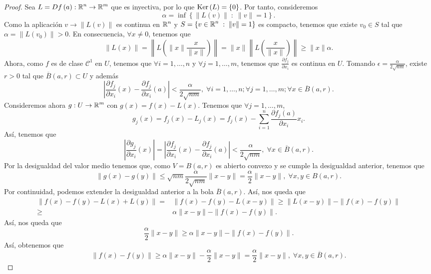 \begin{proof}
	Sea $\displaystyle L = Df\left(a\right) : \mathbb{R}^{n} \to \mathbb{R}^{m} $ que es inyectiva, por lo que $\displaystyle \operatorname{Ker}\left(L\right) = \left\{ 0\right\}  $. Por tanto, consideremos 
	\[\alpha = \inf \left\{ \|L\left(v\right)\| \; : \; \|v\| = 1\right\}  .\]
	Como la aplicación $\displaystyle v \to \|L\left(v\right)\| $ es continua en $\displaystyle \mathbb{R}^{n} $ y $\displaystyle S = \left\{ v \in \mathbb{R}^{n} \; : \; \|v\|=1\right\}  $ es compacto, tenemos que existe $\displaystyle v_{0} \in S $ tal que $\displaystyle \alpha = \|L\left(v_{0}\right)\| > 0 $. En consecuencia, $\displaystyle \forall x \neq 0 $, tenemos que
	\[ \|L\left(x\right)\| = \left\|L\left(\|x\|\frac{x}{\|x\|}\right)\right\| = \|x\|\left\|L\left(\frac{x}{\|x\|}\right)\right\|\geq \|x\|\alpha  .\]
Ahora, como $\displaystyle f $ es de clase $\displaystyle \mathcal{C}^{1} $ en $\displaystyle U $, tenemos que $\displaystyle \forall i = 1, \ldots, n $ y $\displaystyle \forall j = 1, \ldots, m $, tenemos que $\displaystyle \frac{\partial f_{j}}{\partial x_{i}} $ es continua en $\displaystyle U $. Tomando $\displaystyle \epsilon = \frac{\alpha }{2\sqrt{nm}} $, existe $\displaystyle r > 0 $ tal que $\displaystyle \overline{B}\left(a,r\right) \subset U $ y además
\[ \left|\frac{\partial f_{j}}{\partial x_{i}}\left(x\right)-\frac{\partial f_{j}}{\partial x_{i}}\left(a\right)\right| < \frac{\alpha }{2\sqrt{nm}}, \; \forall i = 1, \ldots, n; \forall j = 1, \ldots, m; \forall x \in \overline{B}\left(a,r\right) .\]
Consideremos ahora $\displaystyle g : U \to \mathbb{R}^{m} $ con $\displaystyle g\left(x\right)= f\left(x\right)-L\left(x\right) $. Tenemos que $\displaystyle \forall j= 1, \ldots, m $, 
\[ g_{j}\left(x\right) = f_{j}\left(x\right)-L_{j}\left(x\right) = f_{j}\left(x\right)-\sum^{n}_{i = 1}\frac{\partial f_{j}\left(a\right)}{\partial x_{i}} x_{i}.\]
Así, tenemos que 
\[ \left|\frac{\partial g_{j}}{\partial x_{i}}\left(x\right)\right| = \left|\frac{\partial f_{j}}{\partial x_{i}}\left(x\right)-\frac{\partial f_{j}}{\partial x_{i}}\left(a\right)\right| < \frac{\alpha }{2\sqrt{nm}}, \; \forall x \in \overline{B}\left(a,r\right) .\]
Por la desigualdad del valor medio tenemos que, como $\displaystyle V = B\left(a,r\right) $ es abierto convexo y se cumple la desigualdad anterior, tenemos que
\[ \|g\left(x\right)-g\left(y\right)\| \leq \sqrt{nm}\frac{\alpha }{2\sqrt{nm}} \|x-y\| = \frac{\alpha }{2}\|x-y\|, \; \forall x,y \in B\left(a,r\right)  .\]
Por continuidad, podemos extender la desigualdad anterior a la bola $\displaystyle \overline{B}\left(a,r\right) $. Así, nos queda que 
\[
\begin{split}
	\|f\left(x\right)-f\left(y\right)-L\left(x\right)+L\left(y\right)\| = & \|f\left(x\right)-f\left(y\right)-L\left(x-y\right)\| \geq \|L\left(x-y\right)\| -\|f\left(x\right)-f\left(y\right)\| \\
	\geq & \alpha \|x-y\|-\|f\left(x\right)-f\left(y\right)\| .
\end{split}
\]
Así, nos queda que 
\[\frac{\alpha }{2}\|x-y\| \geq \alpha \|x-y\| - \|f\left(x\right)-f\left(y\right)\| .\]
Así, obtenemos que 
\[\|f\left(x\right)-f\left(y\right)\| \geq \alpha\|x-y\| - \frac{\alpha }{2}\|x-y\| = \frac{\alpha }{2}\|x-y \|, \; \forall x,y \in \overline{B}\left(a,r\right).\]
\end{proof}
